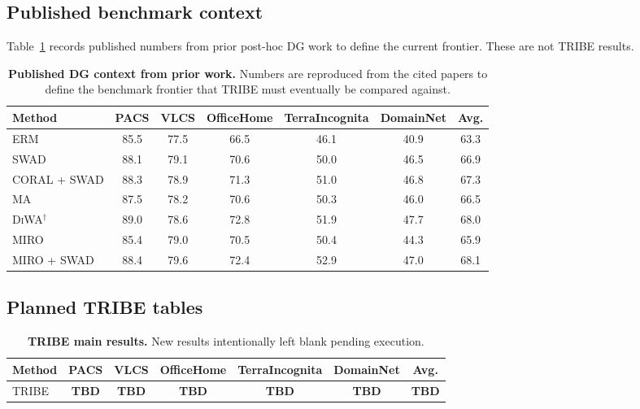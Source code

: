 \documentclass{article}
\newcommand{\TBD}{\textbf{TBD}}
\newcommand{\tribe}{\textup{\textsc{TRIBE}}}
\newcommand{\swad}{\textup{\textsc{SWAD}}}
\newcommand{\diwa}{\textup{\textsc{DiWA}}}
\newcommand{\miro}{\textup{\textsc{MIRO}}}
\newcommand{\erm}{\textup{\textsc{ERM}}}
\newcommand{\1}{\mathbbm{1}}
\begin{document}
\subsection{Published benchmark context}

Table~\ref{tab:published_context} records published numbers from prior post-hoc DG work to define the current frontier. These are not \tribe{} results.

\begin{table}[t]
    \centering
    \caption{\textbf{Published DG context from prior work.} Numbers are reproduced from the cited papers to define the benchmark frontier that \tribe{} must eventually be compared against.}
    \label{tab:published_context}
    \begin{adjustbox}{max width=\linewidth}
    \begin{tabular}{lcccccc}
        \toprule
        Method & PACS & VLCS & OfficeHome & TerraIncognita & DomainNet & Avg. \\
        \midrule
        \erm{} \citep{cha2021swad} & 85.5 & 77.5 & 66.5 & 46.1 & 40.9 & 63.3 \\
        \swad{} \citep{cha2021swad} & 88.1 & 79.1 & 70.6 & 50.0 & 46.5 & 66.9 \\
        CORAL + \swad{} \citep{cha2021swad} & 88.3 & 78.9 & 71.3 & 51.0 & 46.8 & 67.3 \\
        MA \citep{rame2022diwa} & 87.5 & 78.2 & 70.6 & 50.3 & 46.0 & 66.5 \\
        \diwa{}$^\dagger$ \citep{rame2022diwa} & 89.0 & 78.6 & 72.8 & 51.9 & 47.7 & 68.0 \\
        \miro{} \citep{cha2022miro} & 85.4 & 79.0 & 70.5 & 50.4 & 44.3 & 65.9 \\
        \miro{} + \swad{} \citep{cha2022miro} & 88.4 & 79.6 & 72.4 & 52.9 & 47.0 & 68.1 \\
        \bottomrule
    \end{tabular}
    \end{adjustbox}
\end{table}

\subsection{Planned \tribe{} tables}

\begin{table}[t]
    \centering
    \caption{\textbf{\tribe{} main results.} New results intentionally left blank pending execution.}
    \label{tab:tribe_main}
    \begin{tabular}{lcccccc}
        \toprule
        Method & PACS & VLCS & OfficeHome & TerraIncognita & DomainNet & Avg. \\
        \midrule
        \tribe{} & \TBD{} & \TBD{} & \TBD{} & \TBD{} & \TBD{} & \TBD{} \\
        \bottomrule
    \end{tabular}
\end{table}
\end{document}
